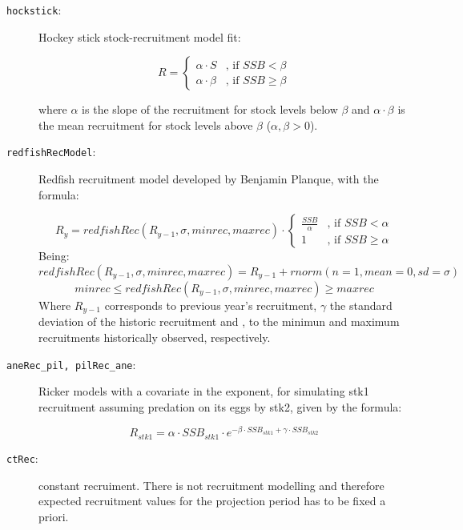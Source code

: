 	\begin{description}

		\item[\texttt{hockstick}:] Hockey stick stock-recruitment model fit:

              \[
 							R = \begin{cases}
   									\alpha\cdot S         & \text{, if } SSB < \beta \\
   									\alpha\cdot \beta     & \text{, if } SSB \geq \beta
  								\end{cases}
							\]

          where $\alpha$ is the slope of the recruitment for stock levels below
          $\beta$ and $\alpha\cdot \beta $ is the mean recruitment for stock levels above
          $\beta$ ($\alpha, \beta > 0$).

		\item[\texttt{redfishRecModel}:] Redfish recruitment model developed by Benjamin Planque, with the formula:

          \[
          R_y = redfishRec(R_{y-1},\sigma, minrec, maxrec) \cdot
            \begin{cases}
              \frac {SSB} \alpha  & \text{, if } SSB < \alpha \\
              1                   & \text{, if } SSB \geq \alpha
            \end{cases}
          \]
          Being:
            $$redfishRec(R_{y-1},\sigma, minrec, maxrec) = R_{y-1} + rnorm(n=1,mean=0,sd=\sigma)$$
            $$minrec \leq redfishRec(R_{y-1},\sigma, minrec, maxrec) \geq maxrec$$
          Where $R_{y-1}$ corresponds to previous year's recruitment, $\gamma$ the standard deviation of
          the historic recruitment and , 
          to the minimun and maximum recruitments historically observed, respectively.

    \item[\texttt{aneRec_pil, pilRec_ane}:] Ricker models with a covariate in the exponent, for simulating
      stk1 recruitment assuming predation on its eggs by stk2, given by the formula:

        $$R_{stk1} = \alpha\cdot SSB_{stk1} \cdot e^{-\beta \cdot SSB_{stk1} + \gamma \cdot SSB_{stk2}}$$

    \item[\texttt{ctRec}:] constant recruiment. There is not recruitment modelling and therefore expected
        recruitment values for the projection period has to be fixed a priori.

  \end{description}

